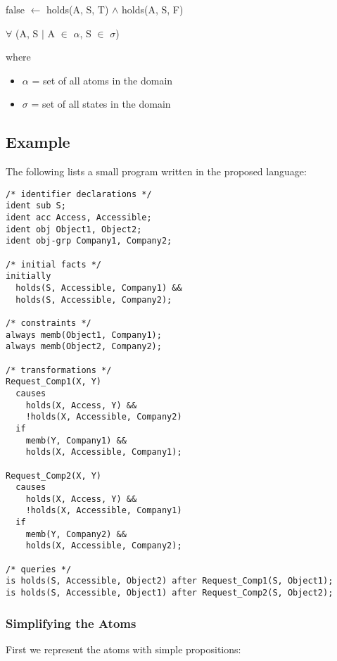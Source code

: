 \documentclass[a4paper]{article}
\begin{document}
      \begin{list}{}{}
        \item false $\leftarrow$ holds(A, S, T) $\land$ holds(A, S, F)
      \end{list}

      $\forall$ (A, S $\mid$ A $\in$ $\alpha$, S $\in$ $\sigma$)

      where

      \begin{itemize}
        \item $\alpha$ = set of all atoms in the domain
        \item $\sigma$ = set of all states in the domain
      \end{itemize}

    \subsection{Example}

      The following lists a small program written in the proposed language:

      \begin{verbatim}
/* identifier declarations */
ident sub S;
ident acc Access, Accessible;
ident obj Object1, Object2;
ident obj-grp Company1, Company2;

/* initial facts */
initially
  holds(S, Accessible, Company1) &&
  holds(S, Accessible, Company2);

/* constraints */
always memb(Object1, Company1);
always memb(Object2, Company2);

/* transformations */
Request_Comp1(X, Y)
  causes
    holds(X, Access, Y) &&
    !holds(X, Accessible, Company2)
  if
    memb(Y, Company1) &&
    holds(X, Accessible, Company1);

Request_Comp2(X, Y)
  causes
    holds(X, Access, Y) &&
    !holds(X, Accessible, Company1)
  if
    memb(Y, Company2) &&
    holds(X, Accessible, Company2);

/* queries */
is holds(S, Accessible, Object2) after Request_Comp1(S, Object1);
is holds(S, Accessible, Object1) after Request_Comp2(S, Object2);
      \end{verbatim}

      \subsubsection{Simplifying the Atoms}

        First we represent the atoms with simple propositions:
\end{document}
